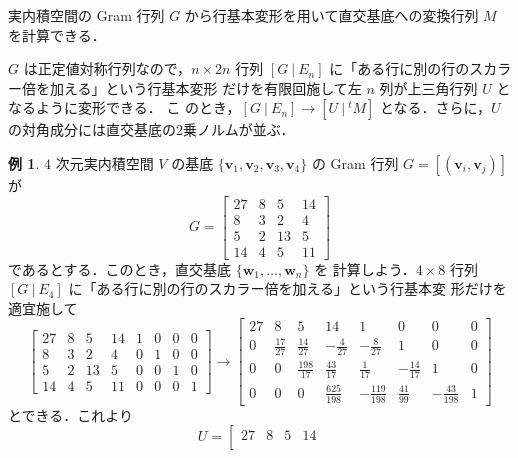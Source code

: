 \documentclass[11pt, uplatex, dvipdfmx]{jsarticle}
\theoremstyle{definition}
\newtheorem*{example}{例}
\begin{document}
\newpage


実内積空間の Gram 行列 $G$ から行基本変形を用いて直交基底への変換行列 $M$ を計算できる．

$G$ は正定値対称行列なので，$n \times 2n$ 行列 $\left[ G \ | \
  E_n\right]$ に「ある行に別の行のスカラー倍を加える」という行基本変形
だけを有限回施して左 $n$ 列が上三角行列 $U$ となるように変形できる． こ
のとき，$\left[ G \ | \ E_n\right] \to \left[ U \ | \ {}^{t}M \right]$
となる．さらに，$U$ の対角成分には直交基底の2乗ノルムが並ぶ．

\begin{example}
  $4$ 次元実内積空間 $V$ の基底 $\{\bm{v}_1, \bm{v}_2, \bm{v}_3,
  \bm{v}_4\}$ の Gram 行列 $G=\left[ (\bm{v}_i, \bm{v}_j)\right]$ が
  \[
    G =\left[
      \begin{array}{rrrr}
        27 & 8 & 5 & 14\\
        8 & 3 & 2 & 4\\
        5 & 2 & 13 & 5\\
        14 & 4 & 5 & 11
      \end{array}
    \right]
  \]
  であるとする．このとき，直交基底 $\{\bm{w}_1, \ldots, \bm{w}_n\}$ を
  計算しよう．$4 \times 8$ 行列 $\left[ G \ | \
    E_4\right]$ に「ある行に別の行のスカラー倍を加える」という行基本変
  形だけを適宜施して
  \[
    \left[
      \begin{array}{rrrr|rrrr}
        27 & 8 & 5 & 14 & 1 & 0 & 0 & 0\\
        8 & 3 & 2 & 4 & 0 & 1 & 0 & 0 \\
        5 & 2 & 13 & 5 & 0 & 0 & 1 & 0\\
        14 & 4 & 5 & 11 & 0 & 0 & 0 & 1
      \end{array}
    \right] \longrightarrow \left[
      \begin{array}{rrrr|rrrr}
        27 & 8 & 5 & 14 & 1 & 0 & 0 & 0\\
        0 & \frac{17}{27} & \frac{14}{27} & -\frac{4}{27} & -\frac{8}{27} & 1 & 0 & 0\\
        0 & 0 & \frac{198}{17} & \frac{43}{17} & \frac{1}{17} & -\frac{14}{17} & 1 & 0\\
        0 & 0 & 0 & \frac{625}{198} & -\frac{119}{198} & \frac{41}{99} & -\frac{43}{198} & 1
      \end{array}
    \right]
  \]
  とできる．これより
  \[
    U = \left[
      \begin{array}{rrrr}
         27 & 8 & 5 & 14 \\

\end{array}\]
\end{example}
\end{document}
